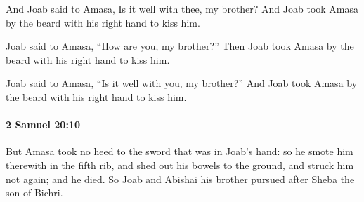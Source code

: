 			\begin{versebox}
					\item[BHS] 
					\item[ASV] And Joab said to Amasa, Is it well with thee, my brother? And Joab took Amasa by the beard with his right hand to kiss him.
					\item[NIV] Joab said to Amasa, “How are you, my brother?” Then Joab took Amasa by the beard with his right hand to kiss him.
					\item[NRSV] Joab said to Amasa, “Is it well with you, my brother?” And Joab took Amasa by the beard with his right hand to kiss him.
			\end{versebox}

		\paragraph{2 Samuel 20:10} %
			\label{2SAMUEL-20-10}

			But Amasa took no heed to the sword that was in Joab’s hand: so he smote him therewith in the fifth rib, and shed out his bowels to the ground, and struck him not again; and he died. So Joab and Abishai his brother pursued after Sheba the son of Bichri.

